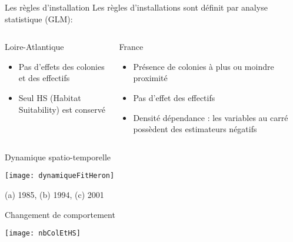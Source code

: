 \documentclass[]{beamer}
\begin{document}
 
 
\begin{frame}{Les règles d’installation}
Les règles d'installations sont définit par analyse statistique (GLM): 
     \begin{columns}
    \begin{column}[c]{0.5\textwidth}
\begin{block}{Loire-Atlantique}
 \begin{itemize}
  \item Pas d'effets des colonies et des effectifs
 \item Seul HS (Habitat Suitability) est conservé 
 \end{itemize}
\end{block}

     \end{column}
    \begin{column}[c]{0.5\textwidth}
\begin{block}{France}
 \begin{itemize}
  \item Présence de colonies à plus ou moindre proximité 
 \item Pas d'effet des effectifs
 \item Densité dépendance : les variables au carré possèdent des estimateurs négatifs
  \end{itemize}

\end{block}
      \end{column}
  \end{columns}

 
\end{frame}

 

  \begin{frame}{Dynamique spatio-temporelle}
\begin{center}
 \texttt{[image: dynamiqueFitHeron]}

 (a) 1985, (b) 1994, (c) 2001
\end{center}
 \end{frame}
 
\begin{frame}{Changement de comportement}
\begin{center}
  \texttt{[image: nbColEtHS]}

\end{center}

 \end{frame}
 
\end{document}
